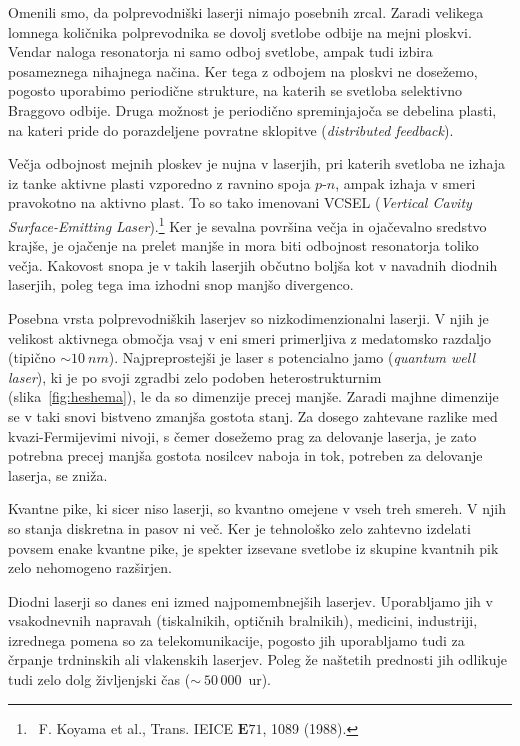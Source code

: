 \begin{remark}
Omenili smo, da polprevodniški laserji nimajo posebnih zrcal. Zaradi velikega lomnega
količnika polprevodnika se dovolj svetlobe odbije na mejni ploskvi. Vendar naloga resonatorja ni 
samo odboj svetlobe, ampak tudi izbira posameznega nihajnega načina. Ker tega z odbojem 
na ploskvi ne dosežemo, pogosto uporabimo periodične strukture, na katerih se svetloba selektivno
Braggovo odbije. Druga možnost je periodično spreminjajoča se debelina plasti, na kateri pride
do porazdeljene povratne sklopitve ({\it distributed feedback}). 
 
Večja odbojnost mejnih ploskev je nujna v laserjih, pri katerih svetloba ne izhaja iz
tanke aktivne plasti vzporedno z ravnino spoja $p$-$n$, ampak izhaja v smeri pravokotno na aktivno plast.
To so tako imenovani VCSEL ({\it Vertical Cavity Surface-Emitting 
Laser}).\footnote{~F. Koyama et al., Trans. IEICE ${\mathbf E71}$, 1089 (1988).} Ker je sevalna površina večja in 
ojačevalno sredstvo krajše, je ojačenje na prelet manjše in mora biti odbojnost resonatorja toliko večja. 
Kakovost snopa je v takih laserjih občutno boljša kot v navadnih diodnih laserjih, poleg tega ima izhodni 
snop manjšo divergenco.
\end{remark}

\begin{remark}
Posebna vrsta polprevodniških laserjev so nizkodimenzionalni laserji. V njih je 
velikost aktivnega območja vsaj v eni smeri primerljiva z medatomsko razdaljo (tipično $\sim 10~\si{nm}$).
Najpreprostejši je laser s potencialno jamo ({\it quantum well laser}), ki 
je po svoji zgradbi zelo podoben heterostrukturnim (slika~\ref{fig:heshema}), le da so dimenzije precej
manjše. Zaradi majhne dimenzije se v taki snovi bistveno zmanjša gostota stanj. 
Za dosego zahtevane razlike med kvazi-Fermijevimi nivoji, s čemer dosežemo prag za delovanje laserja,
je zato potrebna precej manjša gostota nosilcev naboja in tok, potreben za delovanje laserja,
se zniža. 

Kvantne pike, ki sicer niso laserji, so kvantno omejene v vseh treh smereh.
V njih so stanja diskretna in pasov ni več. Ker je tehnološko zelo zahtevno izdelati povsem enake
kvantne pike, je spekter izsevane svetlobe iz skupine kvantnih pik zelo nehomogeno razširjen. 
\end{remark}

Diodni laserji so danes eni izmed najpomembnejših laserjev. Uporabljamo jih v vsakodnevnih napravah 
(tiskalnikih, optičnih bralnikih), medicini, industriji, izrednega
pomena so za telekomunikacije, pogosto jih uporabljamo tudi za 
črpanje trdninskih ali vlakenskih laserjev. 
Poleg že naštetih prednosti jih odlikuje tudi zelo dolg življenjski čas ($\sim~50\,000$~ur). 
\newpage

